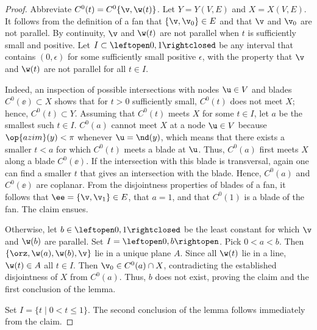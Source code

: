 \begin{proof}
Abbreviate $C^0(t) = C^0\{\v,\w(t)\}$.
Let $Y = Y(V,E)$ and $X = X(V,E)$.
It follows from the definition of a fan that $\{\v,\v_0\}\in E$ and
that $\v$ and $\v_0$ are not parallel.  By continuity, $\v$ and $\w(t)$
are not parallel when $t$ is sufficiently small and positive.  
Let $I\subset\leftopen0,1\rightclosed$ be any interval that contains
$(0,\epsilon)$ for some sufficiently small positive $\epsilon$, with the
property that $\v$ and $\w(t)$ are not parallel for all $t\in I$.

  Indeed, an inspection of possible
intersections with nodes $\u\in V$ and blades $C^0(\ee)\subset X$
shows that for $t>0$ sufficiently small, $C^0(t)$ does not meet $X$;
hence, $C^0(t)\subset Y$.  Assuming that $C^0(t)$ meets $X$ for some
$t\in I$, let $a$ be the smallest such $t\in I$.  $C^0(a)$ cannot meet
$X$ at a node $\u\in V$ because $\op{azim}(y)<\pi$ whenever
$\u=\nd(y)$, which means that
there exists a smaller $t<a$ for which $C^0(t)$ meets a blade at $\u$.
Thus, $C^0(a)$ first meets $X$ along a blade $C^0(\ee)$. If the
intersection with this blade is transversal, again one can find a
smaller $t$ that gives an intersection with the blade.  Hence,
$C^0(a)$ and $C^0(\ee)$ are coplanar.  From the disjointness
properties of blades of a fan, it follows that $\ee = \{\v,\v_1\}\in
E$, that $a=1$, and that $C^0(1)$ is a blade of the fan.  The claim
ensues.

  Otherwise, let $b\in
\leftopen0,1\rightclosed$ be the least constant for which $\v$ and
$\w(b)$ are parallel.  Set  $I=\leftopen0,b\rightopen$.  
Pick $0<a<b$.  Then $\{\orz,\w(a),\w(b),\v\}$ lie in a unique plane
$A$.  Since all $\w(t)$ lie in a line, $\w(t)\in A$ all $t\in I$.
Then $\v_0\in C^0(a)\cap X$, contradicting the established
disjointness of $X$ from $C^0(a)$.  Thus, $b$ does not exist, proving
 the claim and the first conclusion of the lemma.

Set $I= \{t\mid 0 < t \le 1\}$.  The second conclusion of the lemma
follows immediately from the claim.
\end{proof}


